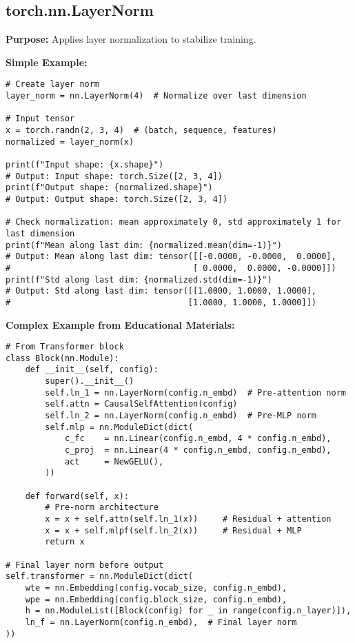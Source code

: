 \documentclass[11pt,a4paper]{book}
\begin{document}
\subsection{torch.nn.LayerNorm}

\textbf{Purpose:} Applies layer normalization to stabilize training.

\textbf{Simple Example:}
\begin{verbatim}
# Create layer norm
layer_norm = nn.LayerNorm(4)  # Normalize over last dimension

# Input tensor
x = torch.randn(2, 3, 4)  # (batch, sequence, features)
normalized = layer_norm(x)

print(f"Input shape: {x.shape}")
# Output: Input shape: torch.Size([2, 3, 4])
print(f"Output shape: {normalized.shape}")
# Output: Output shape: torch.Size([2, 3, 4])

# Check normalization: mean approximately 0, std approximately 1 for last dimension
print(f"Mean along last dim: {normalized.mean(dim=-1)}")
# Output: Mean along last dim: tensor([[-0.0000, -0.0000,  0.0000],
#                                     [ 0.0000,  0.0000, -0.0000]])
print(f"Std along last dim: {normalized.std(dim=-1)}")
# Output: Std along last dim: tensor([[1.0000, 1.0000, 1.0000],
#                                    [1.0000, 1.0000, 1.0000]])
\end{verbatim}

\textbf{Complex Example from Educational Materials:}
\begin{verbatim}
# From Transformer block
class Block(nn.Module):
    def __init__(self, config):
        super().__init__()
        self.ln_1 = nn.LayerNorm(config.n_embd)  # Pre-attention norm
        self.attn = CausalSelfAttention(config)
        self.ln_2 = nn.LayerNorm(config.n_embd)  # Pre-MLP norm
        self.mlp = nn.ModuleDict(dict(
            c_fc    = nn.Linear(config.n_embd, 4 * config.n_embd),
            c_proj  = nn.Linear(4 * config.n_embd, config.n_embd),
            act     = NewGELU(),
        ))
    
    def forward(self, x):
        # Pre-norm architecture
        x = x + self.attn(self.ln_1(x))     # Residual + attention
        x = x + self.mlpf(self.ln_2(x))     # Residual + MLP
        return x

# Final layer norm before output
self.transformer = nn.ModuleDict(dict(
    wte = nn.Embedding(config.vocab_size, config.n_embd),
    wpe = nn.Embedding(config.block_size, config.n_embd),
    h = nn.ModuleList([Block(config) for _ in range(config.n_layer)]),
    ln_f = nn.LayerNorm(config.n_embd),  # Final layer norm
))
\end{verbatim}
\end{document}

